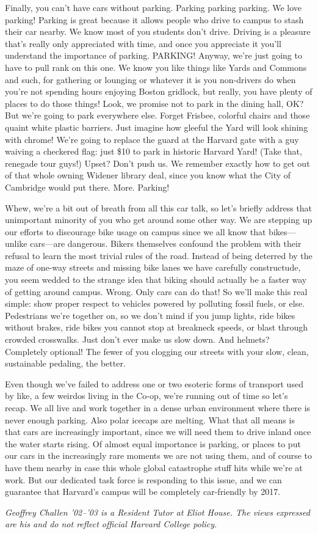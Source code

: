Finally, you can't have cars without parking. Parking parking parking. We
love parking! Parking is great because it allows people who drive to campus
to stash their car nearby. We know most of you students don't drive. Driving
is a pleasure that's really only appreciated with time, and once you
appreciate it you'll understand the importance of parking. PARKING! Anyway,
we're just going to have to pull rank on this one. We know you like things
like Yards and Commons and such, for gathering or lounging or whatever it is
you non-drivers do when you're not spending hours enjoying Boston gridlock,
but really, you have plenty of places to do those things! Look, we promise
not to park in the dining hall, OK? But we're going to park everywhere else.
Forget Frisbee, colorful chairs and those quaint white plastic barriers. Just
imagine how gleeful the Yard will look shining with chrome! We're going to
replace the guard at the Harvard gate with a guy waiving a checkered flag:
just \$10 to park in historic Harvard Yard! (Take that, renegade tour guys!)
Upset? Don't push us. We remember exactly how to get out of that whole owning
Widener library deal, since you know what the City of Cambridge would put
there. More. Parking!

Whew, we're a bit out of breath from all this car talk, so let's briefly
address that unimportant minority of you who get around some other way. We
are stepping up our efforts to discourage bike usage on campus since we all
know that bikes---unlike cars---are dangerous. Bikers themselves confound the
problem with their refusal to learn the most trivial rules of the road.
Instead of being deterred by the maze of one-way streets and missing bike
lanes we have carefully constructude, you seem wedded to the strange idea
that biking should actually be a faster way of getting around campus. Wrong.
Only cars can do that!  So we'll make this real simple: show proper respect
to vehicles powered by polluting fossil fuels, or else. Pedestrians we're
together on, so we don't mind if you jump lights, ride bikes without brakes,
ride bikes you cannot stop at breakneck speeds, or blast through crowded
crosswalks. Just don't ever make us slow down. And helmets? Completely
optional! The fewer of you clogging our streets with your slow, clean,
sustainable pedaling, the better.

Even though we've failed to address one or two esoteric forms of transport
used by like, a few weirdos living in the Co-op, we're running out of time so
let's recap.  We all live and work together in a dense urban environment
where there is never enough parking. Also polar icecaps are melting. What
that all means is that cars are increasingly important, since we will need
them to drive inland once the water starts rising. Of almost equal importance
is parking, or places to put our cars in the increasingly rare moments we are
not using them, and of course to have them nearby in case this whole global
catastrophe stuff hits while we're at work. But our dedicated task force is
responding to this issue, and we can guarantee that Harvard's campus will be
completely car-friendly by 2017.


\textit{Geoffrey Challen '02--'03 is a Resident Tutor at Eliot House. The
views expressed are his and do not reflect official Harvard College policy.}
